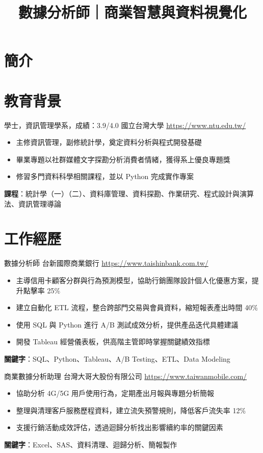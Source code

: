 \documentclass[a4paper, serif, 10pt]{moderncv}
\title{數據分析師｜商業智慧與資料視覺化}
\begin{document}
\maketitle

\section{簡介}

\section{教育背景}

        {學士，資訊管理學系，成績：3.9/4.0}
        {國立台灣大學}
        {\url{https://www.ntu.edu.tw/}}
        {}
        {\begin{itemize}
\item 主修資訊管理，副修統計學，奠定資料分析與程式開發基礎
\item 畢業專題以社群媒體文字探勘分析消費者情緒，獲得系上優良專題獎
\item 修習多門資料科學相關課程，並以 Python 完成實作專案
\end{itemize}
\textbf{課程}：統計學（一）（二）、資料庫管理、資料探勘、作業研究、程式設計與演算法、資訊管理導論}
\section{工作經歷}

        {數據分析師}
        {台新國際商業銀行}
        {\url{https://www.taishinbank.com.tw/}}
        {}
        {\begin{itemize}
\item 主導信用卡顧客分群與行為預測模型，協助行銷團隊設計個人化優惠方案，提升點擊率 25\%
\item 建立自動化 ETL 流程，整合跨部門交易與會員資料，縮短報表產出時間 40\%
\item 使用 SQL 與 Python 進行 A/B 測試成效分析，提供產品迭代具體建議
\item 開發 Tableau 經營儀表板，供高階主管即時掌握關鍵績效指標
\end{itemize}
\textbf{關鍵字}：SQL、Python、Tableau、A/B Testing、ETL、Data Modeling}

        {商業數據分析助理}
        {台灣大哥大股份有限公司}
        {\url{https://www.taiwanmobile.com/}}
        {}
        {\begin{itemize}
\item 協助分析 4G/5G 用戶使用行為，定期產出月報與專題分析簡報
\item 整理與清理客戶服務歷程資料，建立流失預警規則，降低客戶流失率 12\%
\item 支援行銷活動成效評估，透過迴歸分析找出影響續約率的關鍵因素
\end{itemize}
\textbf{關鍵字}：Excel、SAS、資料清理、迴歸分析、簡報製作}
\end{document}
